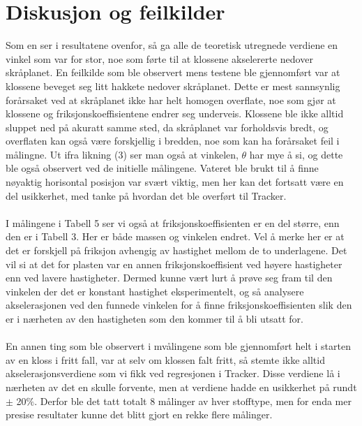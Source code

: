 \documentclass[10pt,a4paper]{report}
\begin{document}
\section*{Diskusjon og feilkilder}
Som en ser i resultatene ovenfor, så ga alle de teoretisk utregnede verdiene en vinkel som var for stor, noe som førte til at klossene akselererte nedover skråplanet. En feilkilde som ble observert mens testene ble gjennomført var at klossene beveget seg litt hakkete nedover skråplanet. Dette er mest sannsynlig forårsaket ved at skråplanet ikke har helt homogen overflate, noe som gjør at klossene og friksjonskoeffisientene endrer seg underveis. Klossene ble ikke alltid sluppet ned på akuratt samme sted, da skråplanet var forholdsvis bredt, og overflaten kan også være forskjellig i bredden, noe som kan ha forårsaket feil i målingne. Ut ifra likning (3) ser man også at vinkelen, $\theta$ har mye å si, og dette ble også observert ved de initielle målingene. Vateret ble brukt til å finne nøyaktig horisontal posisjon var svært viktig, men her kan det fortsatt være en del usikkerhet, med tanke på hvordan det ble overført til Tracker. \\
\\I målingene i Tabell 5 ser vi også at friksjonskoeffisienten er en del større, enn den er i Tabell 3. Her er både massen og vinkelen endret. Vel å merke her er at det er forskjell på friksjon avhengig av hastighet mellom de to underlagene. Det vil si at det for plasten var en annen friksjonskoeffisient ved høyere hastigheter enn ved lavere hastigheter. Dermed kunne vært lurt å prøve seg fram til den vinkelen der det er konstant hastighet eksperimentelt, og så analysere akselerasjonen ved den funnede vinkelen for å finne friksjonskoeffisienten slik den er i nærheten av den hastigheten som den kommer til å bli utsatt for.\\
\\En annen ting som ble observert i mvålingene som ble gjennomført helt i starten av en kloss i fritt fall, var at selv om klossen falt fritt, så stemte ikke alltid akselerasjonsverdiene som vi fikk ved regresjonen i Tracker. Disse verdiene lå i nærheten av det en skulle forvente, men at verdiene hadde en usikkerhet på rundt $\pm$ 20$\%$. Derfor ble det tatt totalt 8 målinger av hver stofftype, men for enda mer presise resultater kunne det blitt gjort en rekke flere målinger.
\end{document}
